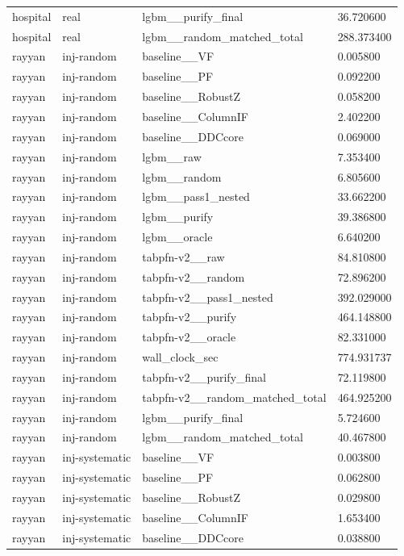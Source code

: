\begin{tabular}{llll}
hospital & real & lgbm\_\_purify\_final & 36.720600 \\
hospital & real & lgbm\_\_random\_matched\_total & 288.373400 \\
rayyan & inj-random & baseline\_\_VF & 0.005800 \\
rayyan & inj-random & baseline\_\_PF & 0.092200 \\
rayyan & inj-random & baseline\_\_RobustZ & 0.058200 \\
rayyan & inj-random & baseline\_\_ColumnIF & 2.402200 \\
rayyan & inj-random & baseline\_\_DDCcore & 0.069000 \\
rayyan & inj-random & lgbm\_\_raw & 7.353400 \\
rayyan & inj-random & lgbm\_\_random & 6.805600 \\
rayyan & inj-random & lgbm\_\_pass1\_nested & 33.662200 \\
rayyan & inj-random & lgbm\_\_purify & 39.386800 \\
rayyan & inj-random & lgbm\_\_oracle & 6.640200 \\
rayyan & inj-random & tabpfn-v2\_\_raw & 84.810800 \\
rayyan & inj-random & tabpfn-v2\_\_random & 72.896200 \\
rayyan & inj-random & tabpfn-v2\_\_pass1\_nested & 392.029000 \\
rayyan & inj-random & tabpfn-v2\_\_purify & 464.148800 \\
rayyan & inj-random & tabpfn-v2\_\_oracle & 82.331000 \\
rayyan & inj-random & wall\_clock\_sec & 774.931737 \\
rayyan & inj-random & tabpfn-v2\_\_purify\_final & 72.119800 \\
rayyan & inj-random & tabpfn-v2\_\_random\_matched\_total & 464.925200 \\
rayyan & inj-random & lgbm\_\_purify\_final & 5.724600 \\
rayyan & inj-random & lgbm\_\_random\_matched\_total & 40.467800 \\
rayyan & inj-systematic & baseline\_\_VF & 0.003800 \\
rayyan & inj-systematic & baseline\_\_PF & 0.062800 \\
rayyan & inj-systematic & baseline\_\_RobustZ & 0.029800 \\
rayyan & inj-systematic & baseline\_\_ColumnIF & 1.653400 \\
rayyan & inj-systematic & baseline\_\_DDCcore & 0.038800 \\

\end{tabular}
